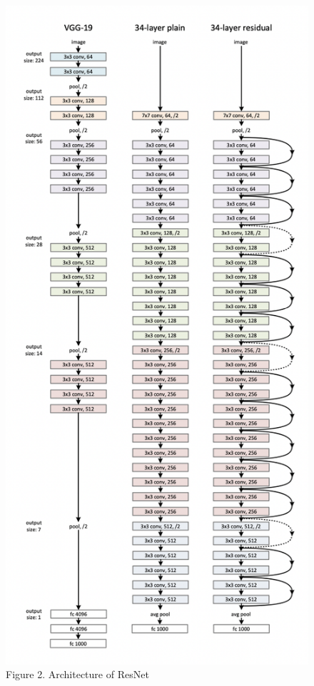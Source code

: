 \documentclass[
]{krantz}
\begin{document}
\begin{figure}

{\centering \includegraphics[width=1\linewidth]{./figures/01-chapter1/ResNet_architecture} 

}

\caption{Figure 2. Architecture of ResNet}\label{fig:ch01-figure02}
\end{figure}
\end{document}
